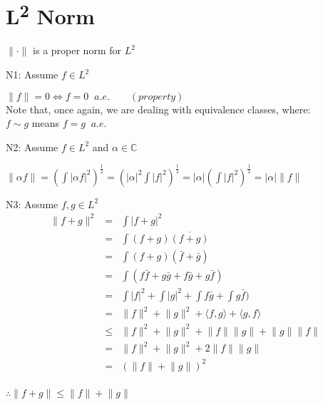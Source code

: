 \documentclass[letterpaper,12pt,fleqn]{article}
\newcommand{\abs}[1]{\left|#1\right|}
\newcommand{\norm}[1]{\lVert#1\rVert}
\newcommand{\inner}[2]{\langle#1,#2\rangle}
\newcommand{\conj}[1]{\bar{#1}}
\newcommand{\Conj}[1]{\overline{#1}}
\begin{document}
\section*{L\textsuperscript2 Norm}

\begin{theorem}
$\norm{\cdot}$ is a proper norm for $L^2$
\end{theorem}

\begin{theproof}
\listbreak
\begin{description}
\item{N1:} Assume $f\in L^2$

$\norm{f}=0\iff f=0\;\; a.e.\qquad(property)$ \\
Note that, once again, we are dealing with equivalence classes, where: \\
$f\sim g$ means $f=g\;\;a.e.$

\item{N2:} Assume $f\in L^2$ and $\alpha\in\mathbb{C}$

$\norm{\alpha f}=\left(\int\abs{\alpha f}^2\right)^{\frac{1}{2}}=
    \left(\abs{\alpha}^2\int\abs{f}^2\right)^{\frac{1}{2}}=
    \abs{\alpha}\left(\int\abs{f}^2\right)^{\frac{1}{2}}=
    \abs{\alpha}\norm{f}$

\item{N3:} Assume $f,g\in L^2$
\[\begin{array}{rcl}
\norm{f+g}^2 &=& \int\abs{f+g}^2 \\
    &=& \int(f+g)\Conj{(f+g)} \\
    &=& \int(f+g)(\conj{f}+\conj{g}) \\
    &=& \int(f\conj{f}+g\conj{g}+f\conj{g}+g\conj{f}) \\
    &=& \int\abs{f}^2+\int\abs{g}^2+\int f\conj{g}+\int g\conj{f}) \\
    &=& \norm{f}^2+\norm{g}^2+\inner{f}{g}+\inner{g}{f} \\
    &\le& \norm{f}^2+\norm{g}^2+\norm{f}\norm{g}+\norm{g}\norm{f} \\
    &=& \norm{f}^2+\norm{g}^2+2\norm{f}\norm{g} \\
    &=& \left(\norm{f}+\norm{g}\right)^2 \\
\end{array}\]

$\therefore \norm{f+g}\le\norm{f}+\norm{g}$
\end{description}
\end{theproof}
\end{document}
